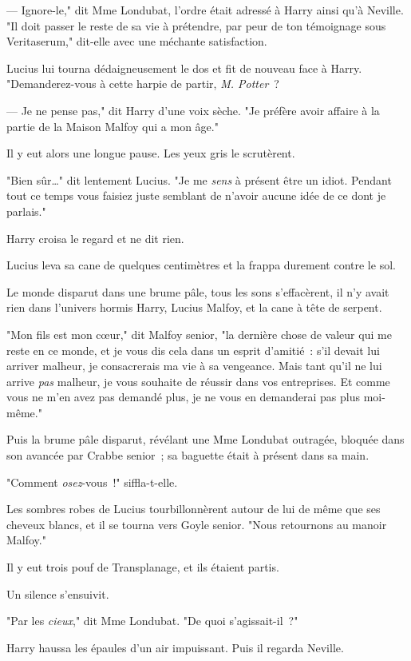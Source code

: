 --- Ignore-le," dit Mme Londubat, l'ordre était adressé à Harry ainsi qu'à Neville. "Il doit passer le reste de sa vie à prétendre, par peur de ton témoignage sous Veritaserum," dit-elle avec une méchante satisfaction.

Lucius lui tourna dédaigneusement le dos et fit de nouveau face à Harry. "Demanderez-vous à cette harpie de partir, \emph{M. Potter}~?

--- Je ne pense pas," dit Harry d'une voix sèche. "Je préfère avoir affaire à la partie de la Maison Malfoy qui a mon âge."

Il y eut alors une longue pause. Les yeux gris le scrutèrent.

"Bien sûr…" dit lentement Lucius. "Je me \emph{sens} à présent être un idiot. Pendant tout ce temps vous faisiez juste semblant de n'avoir aucune idée de ce dont je parlais."

Harry croisa le regard et ne dit rien.

Lucius leva sa cane de quelques centimètres et la frappa durement contre le sol.

Le monde disparut dans une brume pâle, tous les sons s'effacèrent, il n'y avait rien dans l'univers hormis Harry, Lucius Malfoy, et la cane à tête de serpent.

"Mon fils est mon cœur," dit Malfoy senior, "la dernière chose de valeur qui me reste en ce monde, et je vous dis cela dans un esprit d'amitié~: s'il devait lui arriver malheur, je consacrerais ma vie à sa vengeance. Mais tant qu'il ne lui arrive \emph{pas} malheur, je vous souhaite de réussir dans vos entreprises. Et comme vous ne m'en avez pas demandé plus, je ne vous en demanderai pas plus moi-même."

Puis la brume pâle disparut, révélant une Mme Londubat outragée, bloquée dans son avancée par Crabbe senior~; sa baguette était à présent dans sa main.

"Comment \emph{osez}-vous~!" siffla-t-elle.

Les sombres robes de Lucius tourbillonnèrent autour de lui de même que ses cheveux blancs, et il se tourna vers Goyle senior. "Nous retournons au manoir Malfoy."

Il y eut trois pouf de Transplanage, et ils étaient partis.

Un silence s'ensuivit.

"Par les \emph{cieux}," dit Mme Londubat. "De quoi s'agissait-il~?"

Harry haussa les épaules d'un air impuissant. Puis il regarda Neville.

